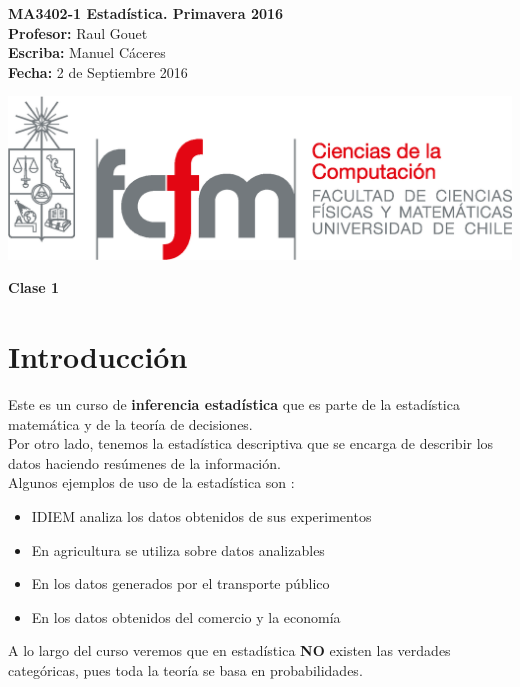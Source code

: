 \documentclass[10pt]{article}
\theoremstyle{plain}
\theoremstyle{definition}
\newcommand{\catnum}{1} %
\newcommand{\fecha}{2 de Septiembre 2016 }
\begin{document}
\vspace*{-1.2 cm}
\begin{minipage}{0.6\textwidth}
\begin{flushleft}
\hspace*{-0.5cm}\textbf{MA3402-1 Estadística. Primavera 2016}\\
\hspace*{-0.5cm}\textbf{Profesor:} Raul Gouet\\
\hspace*{-0.5cm}\textbf{Escriba:} Manuel Cáceres\\
\hspace*{-0.5cm}\textbf{Fecha:} \fecha
\end{flushleft}
\end{minipage}
\begin{minipage}{0.36\textwidth}
\begin{flushright}
\includegraphics[scale=0.3]{imagenes/fcfm_dcc}
\end{flushright}
\end{minipage}
\bigskip

\begin{center}
\LARGE\textbf{Clase \catnum}
\end{center}
\section{Introducción}
Este es un curso de \textbf{inferencia estadística} que es parte de la estadística matemática y de la teoría de decisiones.\\
Por otro lado, tenemos la estadística descriptiva que se encarga de describir los datos haciendo resúmenes de la información.\\
Algunos ejemplos de uso de la estadística son :
\begin{itemize}
\item IDIEM analiza los datos obtenidos de sus experimentos
\item En agricultura se utiliza sobre datos analizables
\item En los datos generados por el transporte público
\item En los datos obtenidos del comercio y la economía
\end{itemize}
A lo largo del curso veremos que en estadística \textbf{NO} existen las verdades categóricas, pues toda la teoría se basa en probabilidades.
\end{document}
